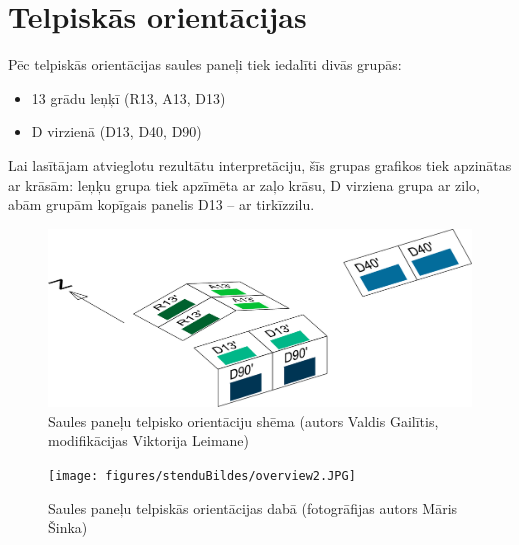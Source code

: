 \section{Telpiskās orientācijas}

Pēc telpiskās orientācijas saules paneļi tiek iedalīti divās grupās:
\begin{itemize}
\item 13 grādu leņķī (R13, A13, D13)
\item D virzienā (D13, D40, D90)
\end{itemize}

Lai lasītājam atvieglotu rezultātu interpretāciju, šīs grupas grafikos tiek apzinātas ar krāsām: leņķu grupa tiek apzīmēta ar zaļo krāsu, D virziena grupa ar zilo, abām grupām kopīgais panelis D13 -- ar tirkīzzilu.

\begin{figure}[h]
    \centering
    \includegraphics[width=0.7\linewidth]{figures/misc/krasas_izvietojums.pdf}
    \caption{Saules paneļu telpisko orientāciju shēma (autors Valdis Gailītis, modifikācijas Viktorija Leimane)}
    \label{fig:paneli}
\end{figure}

\begin{figure}[h]
    \centering
    \texttt{[image: figures/stenduBildes/overview2.JPG]}
    \caption{Saules paneļu telpiskās orientācijas dabā (fotogrāfijas autors Māris Šinka)}
    \label{fig:paneli}
\end{figure}